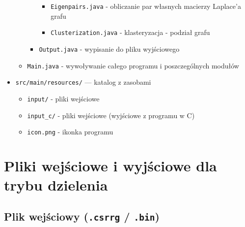 \documentclass{article}
\begin{document}
\begin{itemize}
\begin{itemize}
\begin{itemize}
                            \begin{itemize}
                                \item \texttt{Eigenpairs.java} - obliczanie par własnych macierzy Laplace'a grafu
                                \item \texttt{Clusterization.java} - klasteryzacja - podział grafu
                            \end{itemize}
                        \item \texttt{Output.java} - wypisanie do pliku wyjściowego
                    \end{itemize}
              \item \texttt{Main.java} - wywoływanie całego programu i poszczególnych modułów
          \end{itemize}
          \item \texttt{src/main/resources/} — katalog z zasobami
                \begin{itemize}
                    \item \texttt{input/} - pliki wejściowe
                    \item \texttt{input\_c/} - pliki wejściowe (wyjściowe z programu w C)
                    \item \texttt{icon.png} - ikonka programu
                \end{itemize}
    \end{itemize}

        



\section{Pliki wejściowe i wyjściowe dla trybu dzielenia}

    \subsection{Plik wejściowy (\texttt{.csrrg} / \texttt{.bin})}
    
\end{document}
